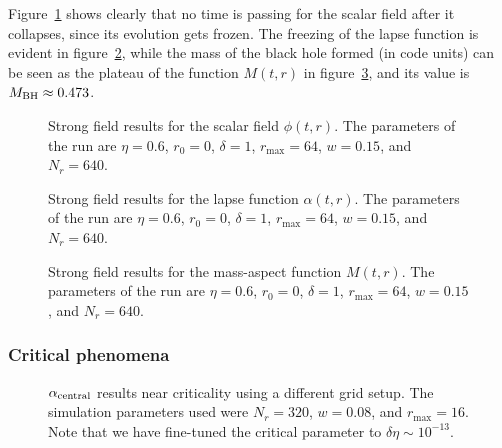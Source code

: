 \documentclass[a4paper,11pt]{article}
\renewcommand{\a}{\alpha}
\renewcommand{\d}{\delta}
\begin{document}
Figure~\ref{fig:phi_strong} shows clearly that no time is passing for the scalar field after it collapses, since its evolution gets frozen. The freezing of the lapse function is evident in figure~\ref{fig:alpha_strong}, while the mass of the black hole formed (in code units) can be seen as the plateau of the function $M(t,r)$ in figure~\ref{fig:mass_strong}, and its value is $M_{\rm BH}\approx0.473$.

\begin{figure}[H]
  \centering
  
  \caption[Strong field results for the scalar field $\phi(t,r)$.]{Strong field results for the scalar field $\phi(t,r)$. The parameters of the run are $\eta=0.6$, $r_{0}=0$, $\delta=1$, $r_{\max}=64$, $w=0.15$, and $N_{r}=640$.}
  \label{fig:phi_strong}
\end{figure}

\begin{figure}[H]
  \centering
  
  \caption[Strong field results for the lapse function $\a(t,r)$.]{Strong field results for the lapse function $\a(t,r)$. The parameters of the run are $\eta=0.6$, $r_{0}=0$, $\delta=1$, $r_{\max}=64$, $w=0.15$, and $N_{r}=640$.}
  \label{fig:alpha_strong}
\end{figure}

\begin{figure}[H]
  \centering
  
  \caption[Strong field results for the mass-aspect function $M(t,r)$.]{Strong field results for the mass-aspect function $M(t,r)$. The parameters of the run are $\eta=0.6$, $r_{0}=0$, $\delta=1$, $r_{\max}=64$, $w=0.15$, and $N_{r}=640$.}
  \label{fig:mass_strong}
\end{figure}

\subsubsection{Critical phenomena}

\begin{figure}[H]
  \centering
  
  \caption[$\alpha_{\rm central}$ results near criticality using a different grid setup.]{$\alpha_{\rm central}$ results near criticality using a different grid setup. The simulation parameters used were $N_{r}=320$, $w=0.08$, and $r_{\max}=16$. Note that we have fine-tuned the critical parameter to $\d\eta\sim10^{-13}$.}
  \label{fig:critical_alpha_best}
\end{figure}
\end{document}
